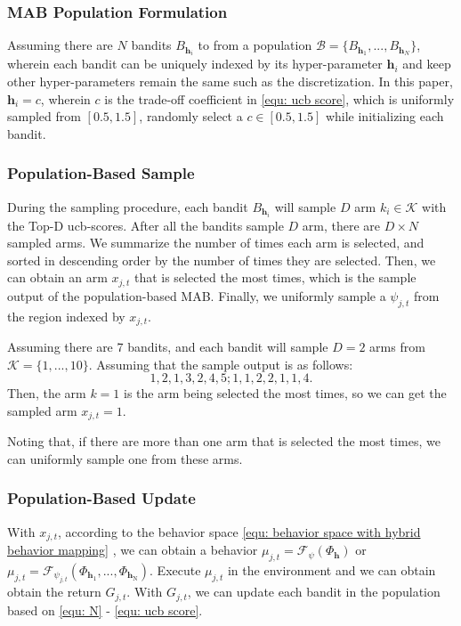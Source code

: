 \subsubsection{MAB Population Formulation}
Assuming there are $N$ bandits $B_{\mathbf{h}_i}$ to from a population $\mathcal{B}=\{B_{\mathbf{h}_1},...,B_{\mathbf{h}_N}\}$, wherein each bandit can be uniquely indexed by its hyper-parameter $\mathbf{h}_i$ and keep other hyper-parameters remain the same such as the discretization. In this paper, $\mathbf{h}_i=c$, wherein $c$ is the trade-off coefficient in \eqref{equ: ucb score}, which is uniformly sampled from $[0.5,1.5]$, \ie randomly select a $c \in [0.5,1.5]$ while initializing each bandit. 

\subsubsection{Population-Based Sample}
During the sampling procedure, each bandit $B_{\mathbf{h}_i}$ will sample $D$ arm $k_{i} \in \mathcal{K}$ with the Top-D ucb-scores.  After all the bandits sample $D$ arm, there are $D \times N$ sampled arms. We summarize the number of times each arm is selected, and sorted in descending order by the number of times they are selected. Then,  we can obtain an arm $x_{j,t}$ that is selected the most times, which is the sample output of the population-based MAB. Finally, we uniformly sample a $\psi_{j,t}$ from  the region indexed by $x_{j,t}$.


\begin{Example}
    Assuming there are 7 bandits, and each bandit will sample $D=2$ arms from $\mathcal{K}=\{1,...,10\}$. Assuming that the sample output is as follows:
    \begin{equation*}
        1,2,1,3,2,4,5; 1,1,2,2,1,1,4.
    \end{equation*}
    Then, the arm $k=1$ is the arm being selected the most times, so we can get the sampled arm $x_{j,t}=1$. 
\end{Example}

\begin{Remark}
    Noting that, if there are more than one arm that is selected the most times, we can uniformly sample one from these arms.
\end{Remark}

\subsubsection{Population-Based Update}
With $x_{j,t}$, according to the behavior space \eqref{equ: behavior space with hybrid behavior mapping} , we can obtain a behavior $\mu_{j,t} =\mathcal{F}_{\psi} (\Phi_{\mathbf{h}})$ or $\mu_{j,t} =\mathcal{F}_{\psi_{j,t}} (\Phi_{\mathbf{h}_1},...,\Phi_{\mathbf{h}_\mathrm{N}})$.  Execute $\mu_{j,t}$ in the environment and we can obtain obtain the return $G_{j,t}$. With $G_{j,t}$, we can update each bandit in the population based on \eqref{equ: N} - \eqref{equ: ucb score}.

